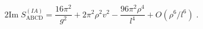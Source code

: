 \begin{equation}
\label{3-7}
2\mathrm{Im}\; S_\mathrm{ABCD}^{(IA)} = \frac{16\pi^2}{g^2} + 2\pi^2 \rho^2v^2 
- \frac{96\pi^2\rho^4}{l^4} + O(\rho^6/l^6)\;.
\end{equation}

